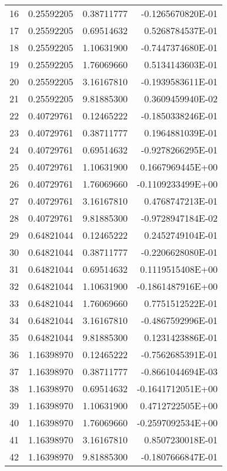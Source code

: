 \begin{longtable}{@{\extracolsep{\fill}}cllr@{}}
16  &  0.25592205  &  0.38711777  &  -0.1265670820E-01 \\
17  &  0.25592205  &  0.69514632  &   0.5268784537E-01 \\
18  &  0.25592205  &  1.10631900  &  -0.7447374680E-01 \\
19  &  0.25592205  &  1.76069660  &   0.5134143603E-01 \\
20  &  0.25592205  &  3.16167810  &  -0.1939583611E-01 \\
21  &  0.25592205  &  9.81885300  &   0.3609459940E-02 \\
22  &  0.40729761  &  0.12465222  &  -0.1850338246E-01 \\
23  &  0.40729761  &  0.38711777  &   0.1964881039E-01 \\
24  &  0.40729761  &  0.69514632  &  -0.9278266295E-01 \\
25  &  0.40729761  &  1.10631900  &   0.1667969445E+00 \\
26  &  0.40729761  &  1.76069660  &  -0.1109233499E+00 \\
27  &  0.40729761  &  3.16167810  &   0.4768747213E-01 \\
28  &  0.40729761  &  9.81885300  &  -0.9728947184E-02 \\
29  &  0.64821044  &  0.12465222  &   0.2452749104E-01 \\
30  &  0.64821044  &  0.38711777  &  -0.2206628080E-01 \\
31  &  0.64821044  &  0.69514632  &   0.1119515408E+00 \\
32  &  0.64821044  &  1.10631900  &  -0.1861487916E+00 \\
33  &  0.64821044  &  1.76069660  &   0.7751512522E-01 \\
34  &  0.64821044  &  3.16167810  &  -0.4867592996E-01 \\
35  &  0.64821044  &  9.81885300  &   0.1231423886E-01 \\
36  &  1.16398970  &  0.12465222  &  -0.7562685391E-01 \\
37  &  1.16398970  &  0.38711777  &  -0.8661044694E-03 \\
38  &  1.16398970  &  0.69514632  &  -0.1641712051E+00 \\
39  &  1.16398970  &  1.10631900  &   0.4712722505E+00 \\
40  &  1.16398970  &  1.76069660  &  -0.2597092534E+00 \\
41  &  1.16398970  &  3.16167810  &   0.8507230018E-01 \\
42  &  1.16398970  &  9.81885300  &  -0.1807666847E-01 \\

\end{longtable}
